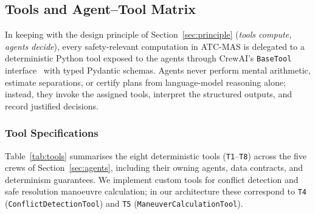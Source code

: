 \begingroup
\setlength{\emergencystretch}{3em}
\subsection{Tools and Agent--Tool Matrix}\label{sec:tools}

In keeping with the design principle of Section~\ref{sec:principle} (\emph{tools compute, agents decide}), every safety-relevant computation in ATC-MAS is delegated to a deterministic Python tool exposed to the agents through CrewAI's \texttt{BaseTool} interface~\cite{crewai} with typed Pydantic schemas. Agents never perform mental arithmetic, estimate separations, or certify plans from language-model reasoning alone; instead, they invoke the assigned tools, interpret the structured outputs, and record justified decisions.

\subsubsection{Tool Specifications}\label{sec:tool-specs}

Table~\ref{tab:tools} summarises the eight deterministic tools (\texttt{T1}--\texttt{T8}) across the five crews of Section~\ref{sec:agents}, including their owning agents, data contracts, and determinism guarantees. We implement custom tools for conflict detection and safe resolution manoeuvre calculation; in our architecture these correspond to \texttt{T4} (\texttt{ConflictDetectionTool}) and \texttt{T5} (\texttt{ManeuverCalculationTool}).

